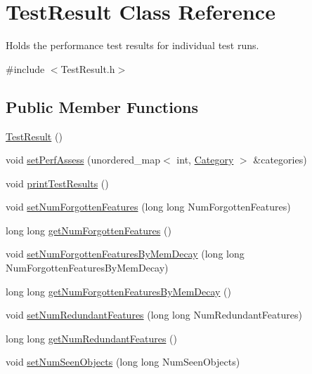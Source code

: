 \hypertarget{class_test_result}{}\section{Test\+Result Class Reference}
\label{class_test_result}


Holds the performance test results for individual test runs.  




{\ttfamily \#include $<$Test\+Result.\+h$>$}

\subsection*{Public Member Functions}
\begin{DoxyCompactItemize}
\item 
\hyperlink{class_test_result_af77fa5c098e06de9a1dd456169a6b329}{Test\+Result} ()
\item 
void \hyperlink{class_test_result_a0828de248f0a56eb99b24211c47db125}{set\+Perf\+Assess} (unordered\+\_\+map$<$ int, \hyperlink{class_category}{Category} $>$ \&categories)
\item 
void \hyperlink{class_test_result_a99aeb67d2dec816bcaf73d62554e65b9}{print\+Test\+Results} ()
\item 
void \hyperlink{class_test_result_a6b879e18776fac2d27c367df9073637c}{set\+Num\+Forgotten\+Features} (long long Num\+Forgotten\+Features)
\item 
long long \hyperlink{class_test_result_af5237dc8023ce158e523e6aa87917941}{get\+Num\+Forgotten\+Features} ()
\item 
void \hyperlink{class_test_result_abb934e44428a188be6d86bb5a9b7b409}{set\+Num\+Forgotten\+Features\+By\+Mem\+Decay} (long long Num\+Forgotten\+Features\+By\+Mem\+Decay)
\item 
long long \hyperlink{class_test_result_a753726e30dc19e459520e996a57449a1}{get\+Num\+Forgotten\+Features\+By\+Mem\+Decay} ()
\item 
void \hyperlink{class_test_result_a893a356de57d3148a33f8ed437d0a0fc}{set\+Num\+Redundant\+Features} (long long Num\+Redundant\+Features)
\item 
long long \hyperlink{class_test_result_a2969cb491e01764d1ba6b55cb959f9be}{get\+Num\+Redundant\+Features} ()
\item 
void \hyperlink{class_test_result_a901e43703e2a09d2dd6f55fdc74f803b}{set\+Num\+Seen\+Objects} (long long Num\+Seen\+Objects)
\item 

\end{DoxyCompactItemize}
